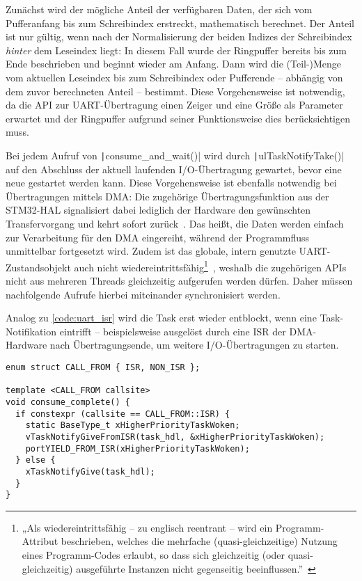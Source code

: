 Zunächst wird der mögliche Anteil der verfügbaren Daten, der sich vom
Pufferanfang bis zum Schreibindex erstreckt, mathematisch berechnet. Der Anteil
ist nur gültig, wenn nach der Normalisierung der beiden Indizes der Schreibindex
\textit{hinter} dem Leseindex liegt: In diesem Fall wurde der Ringpuffer bereits
bis zum Ende beschrieben und beginnt wieder am Anfang. Dann wird die
(Teil-)Menge vom aktuellen Leseindex bis zum Schreibindex oder Pufferende --
abhängig von dem zuvor berechneten Anteil -- bestimmt. Diese Vorgehensweise ist
notwendig, da die API zur UART-Übertragung einen Zeiger und eine Größe als
Parameter erwartet und der Ringpuffer aufgrund seiner Funktionsweise dies
berücksichtigen muss.

Bei jedem Aufruf von \texttt|consume_and_wait()| wird durch
\texttt|ulTaskNotifyTake()| auf den Abschluss der aktuell laufenden
I/O-Übertragung gewartet, bevor eine neue gestartet werden kann. Diese
Vorgehensweise ist ebenfalls notwendig bei Übertragungen mittels DMA: Die
zugehörige Übertragungsfunktion aus der STM32-HAL signalisiert dabei lediglich
der Hardware den gewünschten Transfervorgang und kehrt sofort
zurück~\cite{HAL_UART_Transmit_DMA}. Das heißt, die Daten werden einfach zur
Verarbeitung für den DMA eingereiht, während der Programmfluss unmittelbar
fortgesetzt wird. Zudem ist das globale, intern genutzte UART-Zustandsobjekt
auch nicht wiedereintrittsfähig\footnote{„Als wiedereintrittsfähig -- zu
englisch reentrant -- wird ein Programm-Attribut beschrieben, welches die
mehrfache (quasi-gleichzeitige) Nutzung eines Programm-Codes erlaubt, so dass
sich gleichzeitig (oder quasi-gleichzeitig) ausgeführte Instanzen nicht
gegenseitig
beeinflussen.”~\cite{wiedereintrittsfaehigkeit}}~\cite{stm32_hal_reentrancy},
weshalb die zugehörigen APIs nicht aus mehreren Threads gleichzeitig aufgerufen
werden dürfen. Daher müssen nachfolgende Aufrufe hierbei miteinander
synchronisiert werden.

Analog zu \ref{code:uart_isr} wird die Task erst wieder entblockt, wenn eine
Task-Notifikation eintrifft -- beispielsweise ausgelöst durch eine \ac{ISR} der
DMA-Hardware nach Übertragungsende, um weitere I/O-Übertragungen zu starten.

\begin{code}
\begin{verbatim}
enum struct CALL_FROM { ISR, NON_ISR };

template <CALL_FROM callsite>
void consume_complete() {
  if constexpr (callsite == CALL_FROM::ISR) {
    static BaseType_t xHigherPriorityTaskWoken;
    vTaskNotifyGiveFromISR(task_hdl, &xHigherPriorityTaskWoken);
    portYIELD_FROM_ISR(xHigherPriorityTaskWoken);
  } else {
    xTaskNotifyGive(task_hdl);
  }
}
\end{verbatim}
\end{code}

